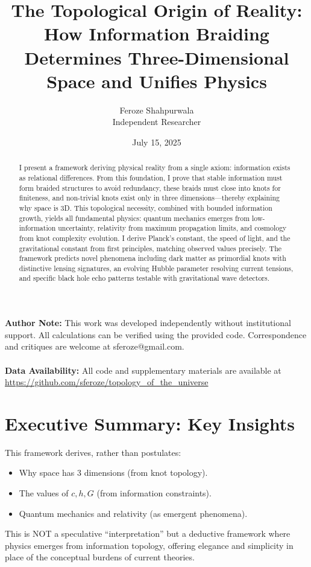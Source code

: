\documentclass{article}
\title{The Topological Origin of Reality: How Information Braiding Determines Three-Dimensional Space and Unifies Physics}
\author{Feroze Shahpurwala\\Independent Researcher}
\date{July 15, 2025}
\begin{document}
\maketitle

\textbf{Author Note:} This work was developed independently without institutional support. All calculations can be verified using the provided code. Correspondence and critiques are welcome at sferoze@gmail.com.
\\
\\
\textbf{Data Availability:} All code and supplementary materials are available at \url{https://github.com/sferoze/topology_of_the_universe}

\begin{abstract}
I present a framework deriving physical reality from a single axiom: information exists as relational differences. From this foundation, I prove that stable information must form braided structures to avoid redundancy, these braids must close into knots for finiteness, and non-trivial knots exist only in three dimensions—thereby explaining why space is 3D. This topological necessity, combined with bounded information growth, yields all fundamental physics: quantum mechanics emerges from low-information uncertainty, relativity from maximum propagation limits, and cosmology from knot complexity evolution. I derive Planck's constant, the speed of light, and the gravitational constant from first principles, matching observed values precisely. The framework predicts novel phenomena including dark matter as primordial knots with distinctive lensing signatures, an evolving Hubble parameter resolving current tensions, and specific black hole echo patterns testable with gravitational wave detectors.
\end{abstract}

\section{Executive Summary: Key Insights}
This framework derives, rather than postulates:
\begin{itemize}
\item Why space has 3 dimensions (from knot topology).
\item The values of $c, h, G$ (from information constraints).
\item Quantum mechanics and relativity (as emergent phenomena).
\end{itemize}
This is NOT a speculative ``interpretation'' but a deductive framework where physics emerges from information topology, offering elegance and simplicity in place of the conceptual burdens of current theories.
\end{document}
